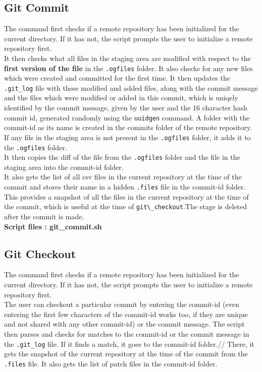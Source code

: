 \documentclass{article}
\begin{document}
\subsection{Git Commit}
The command first checks if a remote repository has been initialized for the current directory. If it has not, the script prompts the user to initialize a remote repository first.\\
It then checks what all files in the staging area are modified with respect to the \textbf{first version of the file} in the \verb".ogfiles" folder. It also checks for any new files which were created and committed for the first time. It then updates the \verb".git_log" file with these modified and added files, along with the commit message and the files which were modified or added in this commit, which is uniqely identified by the commit message, given by the user and the 16 character hash commit id, generated randomly using the \verb"uuidgen" command. A folder with the commit-id as its name is created in the commits folder of the remote repository.\\

If any file in the staging area is not present in the \verb".ogfiles" folder, it adds it to the \verb".ogfiles" folder.\\ It then copies the diff of the file from the \verb".ogfiles" folder and the file in the staging area into the commit-id folder.\\

It also gets the list of all csv files in the current repository at the time of the commit and stores their name in a hidden \verb".files" file in the commit-id folder. This provides a snapshot of all the files in the current repository at the time of the commit, which is useful at the time of \verb"git\_checkout".The stage is deleted after the commit is made.\\

\textbf{Script files : git\_commit.sh}

\subsection{Git Checkout}
The command first checks if a remote repository has been initialized for the current directory. If it has not, the script prompts the user to initialize a remote repository first.\\
The user can checkout a particular commit by entering the commit-id (even entering the first few characters of the commit-id works too, if they are unique and not shared with any other commit-id) or the commit message. The script then parses and checks for matches to the commit-id or the commit message in the \verb".git_log" file. If it finds a match, it goes to the commit-id folder.//
There, it gets the snapshot of the current repository at the time of the commit from the \verb".files" file. It also gets the list of patch files in the commit-id folder.\\
\end{document}
